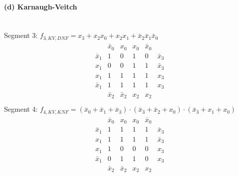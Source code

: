 \documentclass[a4paper]{article}
\begin{document}
\paragraph{(d) Karnaugh-Veitch}\mbox{}\\
Segment 3: $f_{3,KV,DNF} = x_3 + x_2x_0 + x_2x_1 + \bar{x}_2\bar{x}_1\bar{x}_0$
\begin{align*}
	\begin{array}{cccccc}
		&\bar{x}_0&x_0&x_0&\bar{x}_0&\\
		\bar{x}_1&1&0&1&0&\bar{x}_3\\
		x_1&0&0&1&1&\bar{x}_3\\
		x_1&1&1&1&1&x_3\\
		\bar{x}_1&1&1&1&1&x_3\\
		&\bar{x}_2&\bar{x}_2&x_2&x_2&\\
	\end{array}
\end{align*}
Segment 4: $f_{4,KV,KNF} = (\bar{x}_0+\bar{x}_1+\bar{x}_3)\cdot(\bar{x}_3+\bar{x}_2+x_0)\cdot(\bar{x}_3+x_1+x_0)$
\begin{align*}
	\begin{array}{cccccc}
		&\bar{x}_0&x_0&x_0&\bar{x}_0&\\
		\bar{x}_1&1&1&1&1&\bar{x}_3\\
		x_1&1&1&1&1&\bar{x}_3\\
		x_1&1&0&0&0&x_3\\
		\bar{x}_1&0&1&1&0&x_3\\
		&\bar{x}_2&\bar{x}_2&x_2&x_2&\\
	\end{array}
\end{align*}
\end{document}

